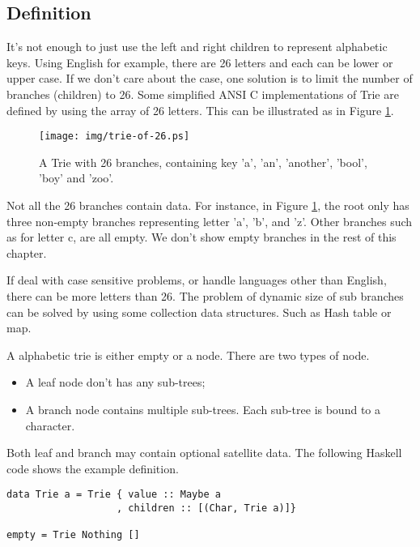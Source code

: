 \documentclass{article}
\begin{document}
\subsection{Definition}
It's not enough to just use the left and right children to represent
alphabetic keys. Using English for example, there are 26 letters
and each can be lower or upper case. If we don't care about the case,
one solution is to limit the number of branches (children) to 26.
Some simplified ANSI C implementations of Trie are defined by using
the array of 26 letters. This can be illustrated as in Figure \ref{fig:trie-of-26}.

\begin{figure}[htbp]
  \centering
  \texttt{[image: img/trie-of-26.ps]}
  \caption{A Trie with 26 branches, containing key 'a', 'an', 'another', 'bool',
    'boy' and 'zoo'.}
  \label{fig:trie-of-26}
\end{figure}

Not all the 26 branches contain data. For instance, in Figure \ref{fig:trie-of-26},
the root only has three non-empty branches representing letter 'a',
'b', and 'z'. Other branches such as for letter c, are all
empty. We don't show empty branches in the rest of this chapter.

If deal with case sensitive problems, or handle languages other than English,
there can be more letters than 26. The problem of dynamic size of sub
branches can be solved by using some collection data structures. Such
as Hash table or map.

A alphabetic trie is either empty or a node. There are two types of node.

\begin{itemize}
\item A leaf node don't has any sub-trees;
\item A branch node contains multiple sub-trees. Each sub-tree is bound to a character.
\end{itemize}

Both leaf and branch may contain optional satellite data. The following Haskell
code shows the example definition.

\lstset{language=Haskell}
\begin{lstlisting}
data Trie a = Trie { value :: Maybe a
                   , children :: [(Char, Trie a)]}

empty = Trie Nothing []
\end{lstlisting}
\end{document}
